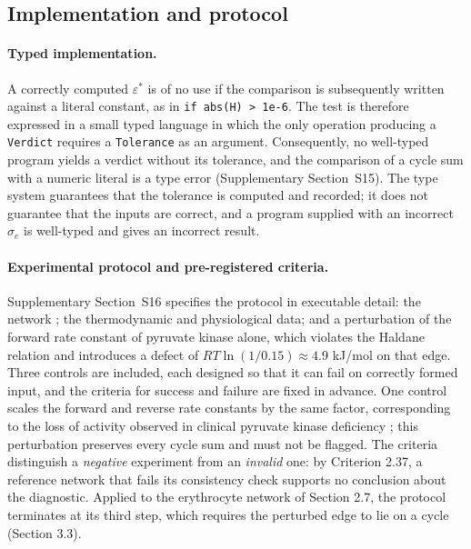 \documentclass[11pt,a4paper]{article}
\theoremstyle{pstyle}
\theoremstyle{definition}
\theoremstyle{remark}
\newcommand{\cf}[1]{\texttt{#1}}
\newcommand{\eps}{\varepsilon}
\newcommand{\epsstar}{\eps^{\ast}}
\begin{document}
\subsection{Implementation and protocol}
\label{sec:language}
\label{sec:protocol}

\paragraph{Typed implementation.} A correctly computed $\epsstar$ is of
no use if the comparison is subsequently written against a literal
constant, as in \verb|if abs(H) > 1e-6|. The test is therefore expressed
in a small typed language in which the only operation producing a
\cf{Verdict} requires a \cf{Tolerance} as an argument. Consequently, no
well-typed program yields a verdict without its tolerance, and the
comparison of a cycle sum with a numeric literal is a type error
(Supplementary Section~S15). The type system guarantees that the
tolerance is computed and recorded; it does not guarantee that the
inputs are correct, and a program supplied with an incorrect $\sigma_e$
is well-typed and gives an incorrect result.

\paragraph{Experimental protocol and pre-registered criteria.}
Supplementary Section~S16 specifies the protocol in executable detail:
the network \citep{brunk2018}; the thermodynamic
\citep{noor2013,flamholz2012} and physiological
\citep{rapoport1975,mulquiney1999} data; and a perturbation of the
forward rate constant of pyruvate kinase alone, which violates the
Haldane relation and introduces a defect of
$RT\ln(1/0.15)\approx4.9$ kJ/mol on that edge. Three controls are
included, each designed so that it can fail on correctly formed input,
and the criteria for success and failure are fixed in advance. One
control scales the forward and reverse rate constants by the same
factor, corresponding to the loss of activity observed in clinical
pyruvate kinase deficiency \citep{zanella2005}; this perturbation
preserves every cycle sum and must not be flagged. The criteria
distinguish a \emph{negative} experiment from an \emph{invalid} one: by
Criterion 2.37, a reference network that fails its consistency
check supports no conclusion about the diagnostic. Applied to the
erythrocyte network of Section 2.7, the protocol terminates at its
third step, which requires the perturbed edge to lie on a cycle
(Section 3.3).
\end{document}
